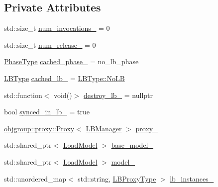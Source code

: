\subsection*{Private Attributes}
\begin{DoxyCompactItemize}
\item 
std\+::size\+\_\+t \hyperlink{structvt_1_1vrt_1_1collection_1_1balance_1_1_l_b_manager_a216981a9e47bf75c8d734d66d98b516a}{num\+\_\+invocations\+\_\+} = 0
\item 
std\+::size\+\_\+t \hyperlink{structvt_1_1vrt_1_1collection_1_1balance_1_1_l_b_manager_a93855ddcd9842e951987256e81aa8802}{num\+\_\+release\+\_\+} = 0
\item 
\hyperlink{namespacevt_a46ce6733d5cdbd735d561b7b4029f6d7}{Phase\+Type} \hyperlink{structvt_1_1vrt_1_1collection_1_1balance_1_1_l_b_manager_aa15bf182a0d70f1fc756ac8893422777}{cached\+\_\+phase\+\_\+} = no\+\_\+lb\+\_\+phase
\item 
\hyperlink{namespacevt_1_1vrt_1_1collection_1_1balance_ac4f99693509affcc67db182d4aad9b5c}{L\+B\+Type} \hyperlink{structvt_1_1vrt_1_1collection_1_1balance_1_1_l_b_manager_aa21ee592ddcc09c269e546c0ebf47fd3}{cached\+\_\+lb\+\_\+} = \hyperlink{namespacevt_1_1vrt_1_1collection_1_1balance_ac4f99693509affcc67db182d4aad9b5cad12268b59a4f1098aee001f9a1750020}{L\+B\+Type\+::\+No\+LB}
\item 
std\+::function$<$ void()$>$ \hyperlink{structvt_1_1vrt_1_1collection_1_1balance_1_1_l_b_manager_a31af388e759240311470c17ec569155c}{destroy\+\_\+lb\+\_\+} = nullptr
\item 
bool \hyperlink{structvt_1_1vrt_1_1collection_1_1balance_1_1_l_b_manager_aa47677efcfd106dbd8ab387b1a8e0c21}{synced\+\_\+in\+\_\+lb\+\_\+} = true
\item 
\hyperlink{structvt_1_1objgroup_1_1proxy_1_1_proxy}{objgroup\+::proxy\+::\+Proxy}$<$ \hyperlink{structvt_1_1vrt_1_1collection_1_1balance_1_1_l_b_manager}{L\+B\+Manager} $>$ \hyperlink{structvt_1_1vrt_1_1collection_1_1balance_1_1_l_b_manager_a4fef6bf68a7aee9980270ceeb5df0c2b}{proxy\+\_\+}
\item 
std\+::shared\+\_\+ptr$<$ \hyperlink{classvt_1_1vrt_1_1collection_1_1balance_1_1_load_model}{Load\+Model} $>$ \hyperlink{structvt_1_1vrt_1_1collection_1_1balance_1_1_l_b_manager_ace781095ef59c156a0b23dea6dea70db}{base\+\_\+model\+\_\+}
\item 
std\+::shared\+\_\+ptr$<$ \hyperlink{classvt_1_1vrt_1_1collection_1_1balance_1_1_load_model}{Load\+Model} $>$ \hyperlink{structvt_1_1vrt_1_1collection_1_1balance_1_1_l_b_manager_a4298255e00b2012d3417a63130dc91c3}{model\+\_\+}
\item 
std\+::unordered\+\_\+map$<$ std\+::string, \hyperlink{structvt_1_1vrt_1_1collection_1_1balance_1_1_l_b_manager_a8b1a7735366beb85c2c2ccc3912cdd80}{L\+B\+Proxy\+Type} $>$ \hyperlink{structvt_1_1vrt_1_1collection_1_1balance_1_1_l_b_manager_aa25f8223d51a33ca1c583b56fd2a98c2}{lb\+\_\+instances\+\_\+}
\end{DoxyCompactItemize}

